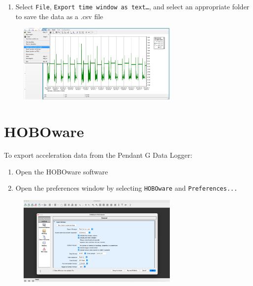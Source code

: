 \documentclass[
  letterpaper,
  DIV=11,
  numbers=noendperiod]{scrreprt}
\providecommand{\tightlist}{%
  \setlength{\itemsep}{0pt}\setlength{\parskip}{0pt}}\usepackage{longtable,booktabs,array}
\begin{document}
\begin{enumerate}
\def\labelenumi{\arabic{enumi}.}
\setcounter{enumi}{6}
\tightlist
\item
  Select \texttt{File}, \texttt{Export\ time\ window\ as\ text…}, and
  select an appropriate folder to save the data as a .csv file
\end{enumerate}

\begin{figure}

{\centering \includegraphics[width=0.7\textwidth,height=\textheight]{chapters/figs/MSRExportStep5.png}

}

\end{figure}

\hypertarget{hoboware-1}{%
\section{HOBOware}\label{hoboware-1}}

To export acceleration data from the Pendant G Data Logger:

\begin{enumerate}
\def\labelenumi{\arabic{enumi}.}
\tightlist
\item
  Open the HOBOware software
\item
  Open the preferences window by selecting \texttt{HOBOware} and
  \texttt{Preferences...}
\end{enumerate}

\begin{figure}

{\centering \includegraphics[width=0.7\textwidth,height=\textheight]{chapters/figs/HOBOExportStep1.png}

}

\end{figure}
\end{document}
